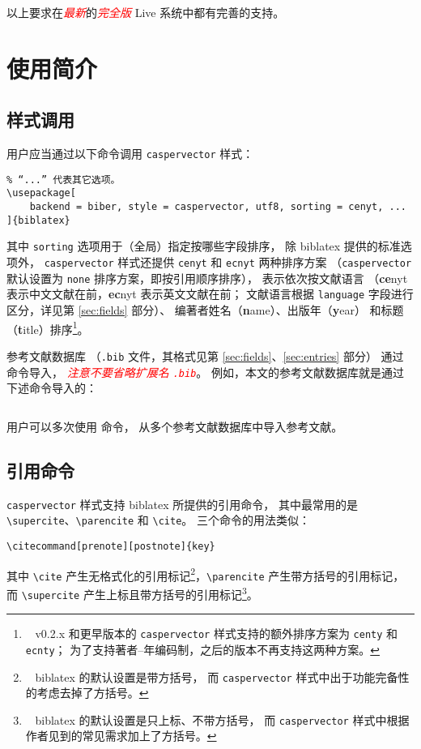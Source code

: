 \documentclass[UTF8]{ctexart}
\newcommand{\myemph}[1]{\emph{\textcolor{red}{#1}}}
\begin{document}
以上要求在\myemph{最新}的\myemph{完全版}
 Live 系统中都有完善的支持。

\section{使用简介}
\subsection{样式调用}

用户应当通过以下命令调用 \verb|caspervector| 样式：
\begin{Verbatim}[frame = single]
% “utf8”可能需要改为“gbk”，根据用户使用的字符编码而定。
% “...” 代表其它选项。
\usepackage[
	backend = biber, style = caspervector, utf8, sorting = cenyt, ...
]{biblatex}
\end{Verbatim}
其中 \verb|sorting| 选项用于（全局）指定按哪些字段排序，
除 biblatex 提供的标准选项\supercite{biblatex}外，%
\verb|caspervector| 样式还提供 \verb|cenyt| 和 \verb|ecnyt| 两种排序方案
（\verb|caspervector| 默认设置为 \verb|none| 排序方案，即按引用顺序排序），
表示依次按文献语言
（\textbf{ce}nyt 表示中文文献在前，\textbf{ec}nyt 表示英文文献在前；
文献语言根据 \verb|language| 字段进行区分，详见第 \ref{sec:fields} 部分）、
编著者姓名（\textbf{n}ame）、出版年（\textbf{y}ear）
和标题（\textbf{t}itle）排序\footnote{\ %
	v0.2.x 和更早版本的 \texttt{caspervector}
	样式支持的额外排序方案为 \texttt{centy} 和 \texttt{ecnty}；
	为了支持著者--年编码制，之后的版本不再支持这两种方案。%
}。

参考文献数据库
（\verb|.bib| 文件，其格式见第 \ref{sec:fields}、\ref{sec:entries} 部分）
通过 \verb|| 命令导入，%
\myemph{注意不要省略扩展名 \texttt{.bib}}。
例如，本文的参考文献数据库就是通过下述命令导入的：
\begin{Verbatim}[frame = single]

\end{Verbatim}
用户可以多次使用 \verb|| 命令，
从多个参考文献数据库中导入参考文献。

\subsection{引用命令}

\verb|caspervector| 样式支持 biblatex 所提供的引用命令，
其中最常用的是 \verb|\supercite|、\verb|\parencite| 和 \verb|\cite|。
三个命令的用法类似：
\begin{Verbatim}[frame = single]
% 可选参数 prenote 和 postnote 分别用于设定引用记号前、后的注释。
\citecommand[prenote][postnote]{key}
\end{Verbatim}
其中 \verb|\cite| 产生无格式化的引用标记\footnote{\ %
	biblatex 的默认设置是带方括号，
	而 \texttt{caspervector} 样式中出于功能完备性的考虑去掉了方括号。%
}，\verb|\parencite| 产生带方括号的引用标记，
而 \verb|\supercite| 产生上标且带方括号的引用标记\footnote{\ %
	biblatex 的默认设置是只上标、不带方括号，
	而 \texttt{caspervector} 样式中根据作者见到的常见需求加上了方括号。%
}。
\end{document}
